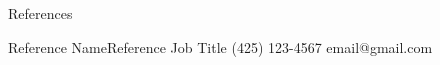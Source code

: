 \documentclass[11pt,oneside]{article}
\begin{document}
\heading

\begin{ressection}{References}

    \begin{refitem}{Reference Name}{Reference Job Title}
    {(425) 123-4567}
    {email@gmail.com}
    \end{refitem}

\end{ressection}
\end{document}
